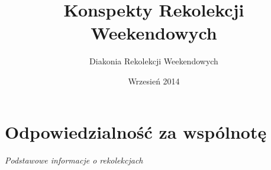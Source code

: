 \documentclass[a5paper,10pt,polish]{book}
\title{Konspekty Rekolekcji Weekendowych}
\date{Wrzesień 2014}
\author{Diakonia Rekolekcji Weekendowych}
\begin{document}
\maketitle
\tableofcontents
{}\label{index::doc}



\part{Odpowiedzialność za wspólnotę}
\label{miliardowice-2005-jesien/index:odpowiedzialnosc-za-wspolnote}\label{miliardowice-2005-jesien/index:spis-tresci}\label{miliardowice-2005-jesien/index::doc}\paragraph{Podstawowe informacje o rekolekcjach}
\end{document}
